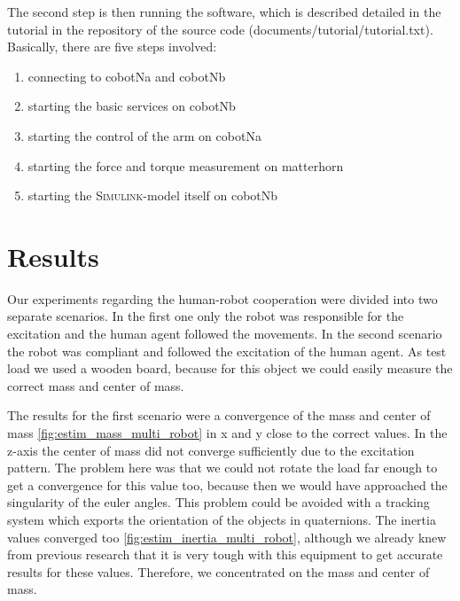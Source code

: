 The second step is then running the software, which is described detailed in the tutorial in the repository of the source code (documents/tutorial/tutorial.txt). Basically, there are five steps involved:
\begin{enumerate}
	\item connecting to cobotNa and cobotNb
	\item starting the basic services on cobotNb
	\item starting the control of the arm on cobotNa
	\item starting the force and torque measurement on matterhorn
	\item starting the \textsc{Simulink}-model itself on cobotNb
\end{enumerate}

\section{Results}
Our experiments regarding the human-robot cooperation were divided into two separate scenarios. In the first one only the robot was responsible for the excitation and the human agent followed the movements. In the second scenario the robot was compliant and followed the excitation of the human agent. As test load we used a wooden board, because for this object we could easily measure the correct mass and center of mass.

The results for the first scenario were a convergence of the mass and center of mass \ref{fig:estim_mass_multi_robot} in x and y close to the correct values. In the z-axis the center of mass did not converge sufficiently due to the excitation pattern. The problem here was that we could not rotate the load far enough to get a convergence for this value too, because then we would have approached the singularity of the euler angles. This problem could be avoided with a tracking system which exports the orientation of the objects in quaternions. The inertia values converged too \ref{fig:estim_inertia_multi_robot}, although we already knew from previous research that it is very tough with this equipment to get accurate results for these values. Therefore, we concentrated on the mass and center of mass.

